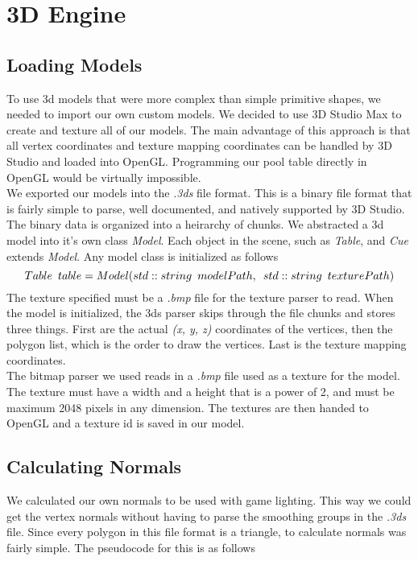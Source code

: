 
\section{3D Engine}

	\subsection{Loading Models}
	To use 3d models that were more complex than simple primitive shapes, we needed to import our own custom models.  We decided to use 3D Studio Max to create and texture all of our models. The main advantage of this approach is that all vertex coordinates and texture mapping coordinates can be handled by 3D Studio and loaded into OpenGL. Programming our pool table directly in OpenGL would be virtually impossible.\\
	We exported our models into the \textit{.3ds} file format. This is a binary file format that is fairly simple to parse, well documented, and natively supported by 3D Studio. The binary data is organized into a heirarchy of chunks. We abstracted a 3d model into it's own class \textit{Model}. Each object in the scene, such as \textit{Table}, and \textit{Cue} extends \textit{Model}. Any model class is initialized as follows
	\begin{equation}
	Table{\enskip}table = Model(std::string{\enskip}modelPath,{\enskip}std::string{\enskip}texturePath)
	\end{equation}
The texture specified must be a \textit{.bmp} file for the texture parser to read. When the model is initialized, the 3ds parser skips through the file chunks and stores three things. First are the actual \textit{(x, y, z)} coordinates of the vertices, then the polygon list, which is the order to draw the vertices. Last is the texture mapping coordinates.\\
	The bitmap parser we used reads in a \textit{.bmp} file used as a texture for the model. The texture must have a width and a height that is a power of 2, and must be maximum 2048 pixels in any dimension. The textures are then handed to OpenGL and a texture id is saved in our model.


	\subsection{Calculating Normals}
	We calculated our own normals to be used with game lighting. This way we could get the vertex normals without having to parse the smoothing groups in the \textit{.3ds} file. Since every polygon in this file format is a triangle, to calculate normals was fairly simple. The pseudocode for this is as follows

